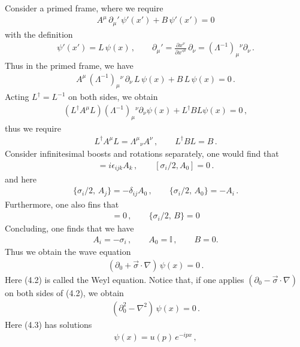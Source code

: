 \documentclass[11pt, onesided]{book}
\theoremstyle{break}
\theoremstyle{break}
\newcommand{\pd}{\partial}
\begin{document}
Consider a primed frame, where we require
\begin{align*}
A^\mu\, \pd_\mu' \, \psi'(x') + B\, \psi'(x') = 0
\end{align*}
with the definition
\begin{align*}
\psi'(x') = L\, \psi(x)\,, \qquad
\pd_\mu' = \frac{\pd x^\nu}{\pd x'^\mu}\,\pd_\nu = (\Lambda^{-1})_\mu{}^{\nu}\pd_\nu\,.
\end{align*}
Thus in the primed frame, we have
\begin{align*}
A^\mu \, (\Lambda^{-1})_\mu{}^{\nu}\,\pd_\nu \, L\,\psi(x) + B \, L\,\psi(x) = 0\,.
\end{align*}
Acting $L^\dagger = L^{-1}$ on both sides, we obtain
\begin{align*}
(L^\dagger A^\mu L ) ( \Lambda^{-1})_{\mu}{}^\nu\pd_\nu \psi(x) + L^\dagger BL\psi(x) =0\,,
\end{align*}
thus we require
\begin{align*}
L^\dagger A^\mu L = \Lambda^\mu{}_{\nu}A^\nu \,,\qquad L^\dagger BL = B\,.
\end{align*}
Consider infinitesimal boosts and rotations separately, one would find that
\begin{align*}
[\sigma_i/2,\, A_j] = i\epsilon_{ijk} A_k\,,\qquad [\sigma_i/2, A_0] = 0\,.
\end{align*} 
and here
\begin{align*}
\{\sigma_i/2,\, A_j\}  = -\delta_{ij}A_0\,,\qquad
\{\sigma_i/2,\, A_0\} = -A_i\,.
\end{align*}
Furthermore, one also fins that 
\begin{align*}
[\sigma_i/2, B] = 0\,,\qquad \{\sigma_i/2,\,B\} = 0
\end{align*}
Concluding, one finds that we have
\begin{align*}
A_i = -\sigma_i\,,\qquad A_0 = \mathbb{I}\,,\qquad B = 0.
\end{align*}
Thus we obtain the wave equation
\begin{align}
\left(\pd_0 + \vec{\sigma}\cdot \nabla\right) \,\psi(x)  = 0\,.
\end{align}
Here (4.2) is called the Weyl equation. Notice that, if one applies $(\pd_0 - \vec{\sigma}\cdot \nabla)$ on both sides of (4.2), we obtain
\begin{align}
(\pd_0^2 - \nabla^2) \, \psi(x) = 0\,.
\end{align}
Here (4.3) has solutions 
\begin{align*}
\psi(x) = u(p)\, e^{-ipx}\,,
\end{align*}
\end{document}
